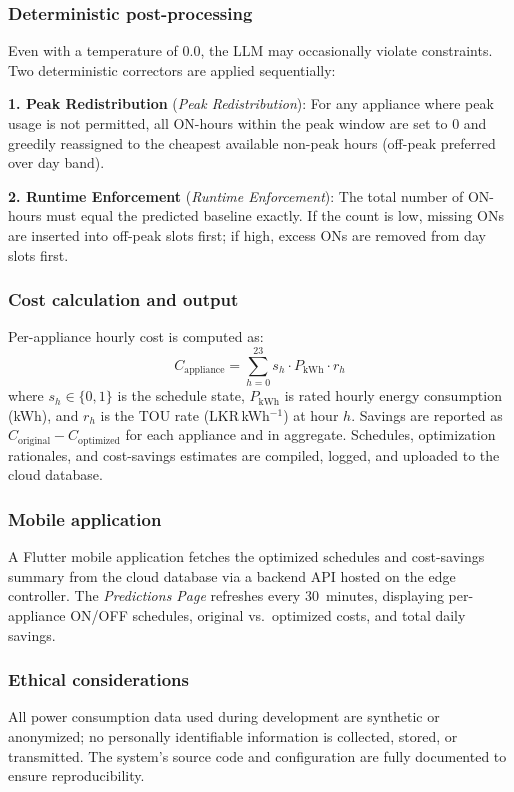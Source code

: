 \documentclass[conference]{IEEEtran}
\begin{document}
\subsubsection{Deterministic post-processing}
Even with a temperature of $0.0$, the LLM may occasionally violate
constraints. Two deterministic correctors are applied sequentially:

\textbf{1. Peak Redistribution} (\emph{Peak Redistribution}):
For any appliance where peak usage is not permitted, all
ON-hours within the peak window are set to 0 and greedily
reassigned to the cheapest available non-peak hours
(off-peak preferred over day band).

\textbf{2. Runtime Enforcement} (\emph{Runtime Enforcement}):
The total number of ON-hours must equal the predicted
baseline exactly.
If the count is low, missing ONs are inserted into
off-peak slots first; if high, excess ONs are removed from
day slots first.

\subsubsection{Cost calculation and output}
Per-appliance hourly cost is computed as:
\begin{equation}
  C_{\text{appliance}} = \sum_{h=0}^{23}
    s_h \cdot P_{\text{kWh}} \cdot r_h
  \label{eq:cost}
\end{equation}
where $s_h \in \{0,1\}$ is the schedule state,
$P_{\text{kWh}}$ is rated hourly energy consumption (kWh),
and $r_h$ is the TOU rate (LKR\,kWh$^{-1}$) at hour $h$.
Savings are reported as $C_{\text{original}} - C_{\text{optimized}}$
for each appliance and in aggregate.
Schedules, optimization rationales, and cost-savings estimates
are compiled, logged, and uploaded to the cloud database.

\subsubsection{Mobile application}
A Flutter mobile application fetches the optimized schedules
and cost-savings summary from the cloud database via a backend API
hosted on the edge controller.
The \textit{Predictions Page} refreshes every 30~minutes,
displaying per-appliance ON/OFF schedules, original vs.\
optimized costs, and total daily savings.

\subsubsection{Ethical considerations}
All power consumption data used during development are synthetic
or anonymized; no personally identifiable information is
collected, stored, or transmitted.
The system's source code and configuration are fully documented
to ensure reproducibility.
\end{document}
